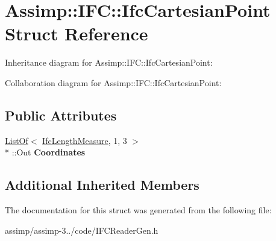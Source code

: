 \hypertarget{struct_assimp_1_1_i_f_c_1_1_ifc_cartesian_point}{\section{Assimp\+:\+:I\+F\+C\+:\+:Ifc\+Cartesian\+Point Struct Reference}
\label{struct_assimp_1_1_i_f_c_1_1_ifc_cartesian_point}
}


Inheritance diagram for Assimp\+:\+:I\+F\+C\+:\+:Ifc\+Cartesian\+Point\+:


Collaboration diagram for Assimp\+:\+:I\+F\+C\+:\+:Ifc\+Cartesian\+Point\+:
\subsection*{Public Attributes}
\begin{DoxyCompactItemize}
\item 
\hypertarget{struct_assimp_1_1_i_f_c_1_1_ifc_cartesian_point_a468bdf1e03e8f63561c111874613a5be}{\hyperlink{struct_assimp_1_1_s_t_e_p_1_1_list_of}{List\+Of}$<$ \hyperlink{class_assimp_1_1_s_t_e_p_1_1_e_x_p_r_e_s_s_1_1_primitive_data_type}{Ifc\+Length\+Measure}, 1, 3 $>$\\*
\+::Out {\bfseries Coordinates}}\label{struct_assimp_1_1_i_f_c_1_1_ifc_cartesian_point_a468bdf1e03e8f63561c111874613a5be}

\end{DoxyCompactItemize}
\subsection*{Additional Inherited Members}


The documentation for this struct was generated from the following file\+:\begin{DoxyCompactItemize}
\item 
assimp/assimp-\/3../code/I\+F\+C\+Reader\+Gen.\+h\end{DoxyCompactItemize}
